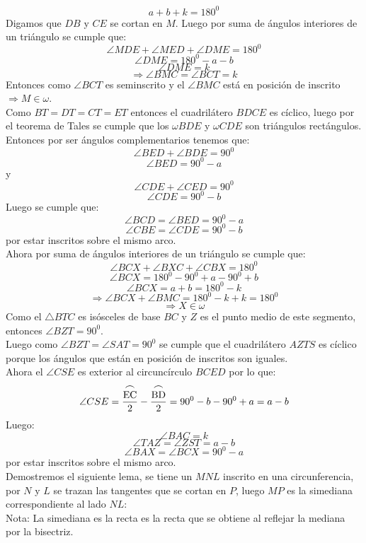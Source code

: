 \documentclass{book}
\begin{document}
\begin{enumerate}
        $$a+b+k=180^0$$
        Digamos que $DB$ y $CE$ se cortan en $M$. Luego por suma de ángulos interiores de un triángulo se cumple que:
        $$\angle MDE+\angle MED+\angle DME=180^0$$
        $$\angle DME=180^0-a-b$$
        $$\angle DME=k$$
        $$\Rightarrow\angle BMC=\angle BCT=k$$
        Entonces como $\angle BCT$ es seminscrito y el $\angle BMC$ está en posición de inscrito $\Rightarrow M\in\omega$.\\
        Como $BT=DT=CT=ET$ entonces el cuadrilátero $BDCE$ es cíclico, luego por el teorema de Tales se cumple que los $\omega BDE$ y $\omega CDE$ son triángulos rectángulos.\\
        Entonces por ser ángulos complementarios tenemos que:
        $$\angle BED+\angle BDE=90^0$$
        $$\angle BED=90^0-a$$
        y
        $$\angle CDE+\angle CED=90^0$$
        $$\angle CDE=90^0-b$$
        Luego se cumple que:
        $$\angle BCD=\angle BED=90^0-a$$
        $$\angle CBE=\angle CDE=90^0-b$$
        por estar inscritos sobre el mismo arco.\\
        Ahora por suma de ángulos interiores de un triángulo se cumple que:
        $$\angle BCX+\angle BXC+\angle CBX=180^0$$
        $$\angle BCX=180^0-90^0+a-90^0+b$$
        $$\angle BCX=a+b=180^0-k$$
        $$\Rightarrow\angle BCX+\angle BMC=180^0-k+k=180^0$$
        $$\Rightarrow X\in\omega$$
        Como el $\triangle BTC$ es isósceles de base $BC$ y $Z$ es el punto medio de este segmento, entonces $\angle BZT=90^0$.\\
        Luego como $\angle BZT=\angle SAT=90^0$ se cumple que el cuadrilátero $AZTS$ es cíclico porque los ángulos que están en posición de inscritos son iguales.\\
        Ahora el $\angle CSE$ es exterior al circuncírculo $BCED$ por lo que:
        $$\angle CSE={\stackrel{\textstyle\frown}{\mathrm{EC}}\over 2}-{\stackrel{\textstyle\frown}{\mathrm{BD}}\over 2}=90^0-b-90^0+a=a-b$$
        Luego:
        $$\angle BAC=k$$
        $$\angle TAZ=\angle ZST=a-b$$
        $$\angle BAX=\angle BCX=90^0-a$$
        por estar inscritos sobre el mismo arco.\\
        Demostremos el siguiente lema, se tiene un $MNL$ inscrito en una circunferencia, por $N$ y $L$ se trazan las tangentes que se cortan en $P$, luego $MP$ es la simediana correspondiente al lado $NL$:\\
        Nota: La simediana es la recta es la recta que se obtiene al reflejar la mediana por la bisectriz.

\end{enumerate}
\end{document}

